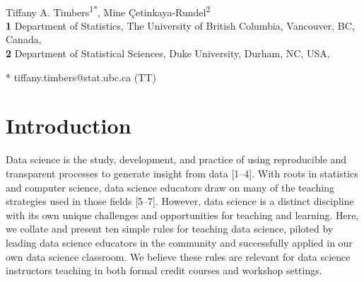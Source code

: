 \documentclass[
  10pt,
  letterpaper,
]{article}
\begin{document}
\vspace*{0.2in}

\begin{flushleft}
{\Large
\textbf{} %
}
\newline
\\
Tiffany A. Timbers\textsuperscript{1*}, Mine
Çetinkaya-Rundel\textsuperscript{2}
\\
\bigskip
\textbf{1} Department of Statistics, The University of British Columbia,
Vancouver, BC, Canada, \\ \textbf{2} Department of Statistical Sciences,
Duke University, Durham, NC, USA, 
\bigskip

% 
%
* tiffany.timbers@stat.ubc.ca (TT)

\end{flushleft}



\linenumbers

\section{Introduction}\label{sec-intro}

Data science is the study, development, and practice of using
reproducible and transparent processes to generate insight from data
{[}1--4{]}. With roots in statistics and computer science, data science
educators draw on many of the teaching strategies used in those fields
{[}5--7{]}. However, data science is a distinct discipline with its own
unique challenges and opportunities for teaching and learning. Here, we
collate and present ten simple rules for teaching data science, piloted
by leading data science educators in the community and successfully
applied in our own data science classroom. We believe these rules are
relevant for data science instructors teaching in both formal credit
courses and workshop settings.
\end{document}
